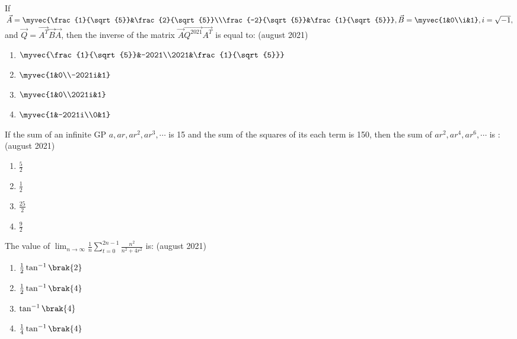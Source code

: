 \iffalse
\title{08-26-2021-shift-1-16-20}
\author{AI24BTECH11011}
\section{mcq-single}
\fi
        \item If $\vec{A}=\myvec{\frac{1}{\sqrt{5}}&\frac{2}{\sqrt{5}}\\\frac{-2}{\sqrt{5}}&\frac{1}{\sqrt{5}}},\vec{B}=\myvec{1&0\\i&1},i=\sqrt{-1},$ and $\vec{Q}=\vec{A^{T}}\vec{B}\vec{A}$, then the inverse of the matrix $\vec{A}\vec{Q^{2021}}\vec{A^{T}}$ is equal to:
		\hfill{(august 2021)}
		\begin{enumerate}
            \item $\myvec{\frac{1}{\sqrt{5}}&-2021\\2021&\frac{1}{\sqrt{5}}}$
            \item $\myvec{1&0\\-2021i&1}$
            \item $\myvec{1&0\\2021i&1}$
            \item $\myvec{1&-2021i\\0&1}$
        \end{enumerate}
        \item If the sum of an infinite GP $a, ar, ar^{2}, ar^{3},\cdots$ is 15 and the sum of the squares of its each term is 150, then the sum of $ar^{2}, ar^{4}, ar^{6}, \cdots$ is :
        \hfill{(august 2021)}  
	\begin{enumerate}
            \item $\frac{5}{2}$
            \item $\frac{1}{2}$
            \item $\frac{25}{2}$
            \item $\frac{9}{2}$
        \end{enumerate}
        \item The value of $\lim_{n \to \infty}\frac{1}{n}\sum_{t=0}^{2n-1}\frac{n^{2}}{n^{2}+4r^{2}}$ is:
         \hfill{(august 2021)}  
		\begin{enumerate}
            \item $\frac{1}{2}\tan^{-1}\brak{2}$
            \item $\frac{1}{2}\tan^{-1}\brak{4}$
            \item $\tan^{-1}\brak{4}$
            \item $\frac{1}{4}\tan^{-1}\brak{4}$
        \end{enumerate}
